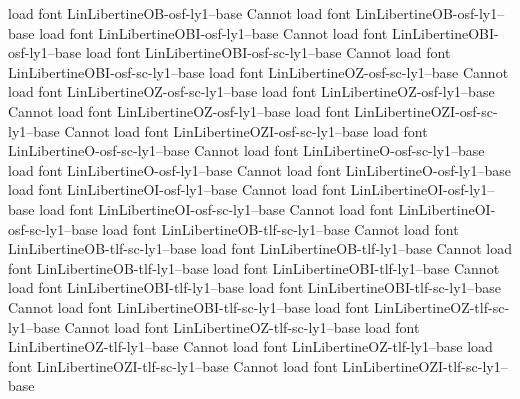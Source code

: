 load font	LinLibertineOB-osf-ly1--base
Cannot load font LinLibertineOB-osf-ly1--base
load font	LinLibertineOBI-osf-ly1--base
Cannot load font LinLibertineOBI-osf-ly1--base
load font	LinLibertineOBI-osf-sc-ly1--base
Cannot load font LinLibertineOBI-osf-sc-ly1--base
load font	LinLibertineOZ-osf-sc-ly1--base
Cannot load font LinLibertineOZ-osf-sc-ly1--base
load font	LinLibertineOZ-osf-ly1--base
Cannot load font LinLibertineOZ-osf-ly1--base
load font	LinLibertineOZI-osf-sc-ly1--base
Cannot load font LinLibertineOZI-osf-sc-ly1--base
load font	LinLibertineO-osf-sc-ly1--base
Cannot load font LinLibertineO-osf-sc-ly1--base
load font	LinLibertineO-osf-ly1--base
Cannot load font LinLibertineO-osf-ly1--base
load font	LinLibertineOI-osf-ly1--base
Cannot load font LinLibertineOI-osf-ly1--base
load font	LinLibertineOI-osf-sc-ly1--base
Cannot load font LinLibertineOI-osf-sc-ly1--base
load font	LinLibertineOB-tlf-sc-ly1--base
Cannot load font LinLibertineOB-tlf-sc-ly1--base
load font	LinLibertineOB-tlf-ly1--base
Cannot load font LinLibertineOB-tlf-ly1--base
load font	LinLibertineOBI-tlf-ly1--base
Cannot load font LinLibertineOBI-tlf-ly1--base
load font	LinLibertineOBI-tlf-sc-ly1--base
Cannot load font LinLibertineOBI-tlf-sc-ly1--base
load font	LinLibertineOZ-tlf-sc-ly1--base
Cannot load font LinLibertineOZ-tlf-sc-ly1--base
load font	LinLibertineOZ-tlf-ly1--base
Cannot load font LinLibertineOZ-tlf-ly1--base
load font	LinLibertineOZI-tlf-sc-ly1--base
Cannot load font LinLibertineOZI-tlf-sc-ly1--base
